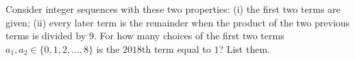 Consider integer sequences with these two properties: (i) the first two terms are given; (ii) every later term is the remainder when the product of the two previous terms is divided by $9$. For how many choices of the first two terms $a_1,a_2\in\{0,1,2,\dots,8\}$ is the $2018$th term equal to $1$? List them.
